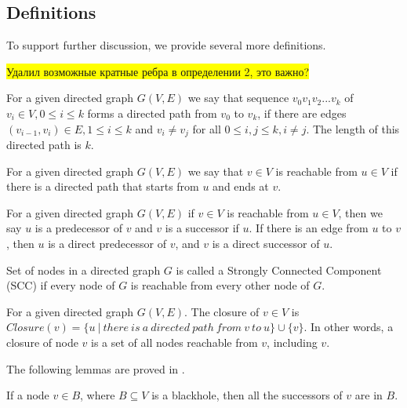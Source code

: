 \documentclass{svproc}
\newcommand{\FIXME}[1]{ %
	\colorbox{yellow}{#1}
}
\newcommand{\FIXME}[1]{ %
}
\begin{document}
\subsection{Definitions}
To support further discussion, we provide several more definitions.

\FIXME{Удалил возможные кратные ребра в определении 2, это важно?}
\begin{definition}
For a given directed graph $G(V,E)$ we say that sequence $v_0v_1v_2...v_{k}$ of $v_i \in V, 0 \leq i \leq k$ forms a directed path from $v_0$ to $v_k$, if there are edges $(v_{i-1}, v_i) \in E, 1 \leq i \leq k$ and $v_i \neq v_j$ for all $0 \leq i, j \leq k, i \neq j$. The length of this directed path is $k$.
\end{definition}

\begin{definition}
For a given directed graph $G(V,E)$ we say that $v \in V$ is reachable from $u \in V$ if there is a directed path that starts from $u$ and ends at $v$.
\end{definition}

\begin{definition}
For a given directed graph $G(V,E)$ if $v \in V$ is reachable from $u \in V$, then we say $u$ is a predecessor of $v$ and $v$ is a successor if $u$.
If there is an edge from $u$ to $v$, then $u$ is a direct predecessor of $v$, and $v$ is a direct successor of $u$.
\end{definition}

\begin{definition}
Set of nodes in a directed graph $G$ is called a Strongly Connected Component (SCC) if every node of $G$ is reachable from every other node of $G$.
\end{definition}

\begin{definition}
For a given directed graph $G(V,E)$. The closure of $v \in V$ is $Closure(v) = \{u\ |\ there\ is\ a\ directed\ path\ from\ v\ to\ u\} \cup \{v\}$.
In other words, a closure of node $v$ is a set of all nodes reachable from $v$, including $v$.
\end{definition}

The following lemmas are proved in \cite{li2010detecting}.

\begin{lemma}
If a node $v \in B$, where $B \subseteq V$ is a blackhole, then all the successors of $v$ are in $B$.
\end{lemma}
\end{document}
